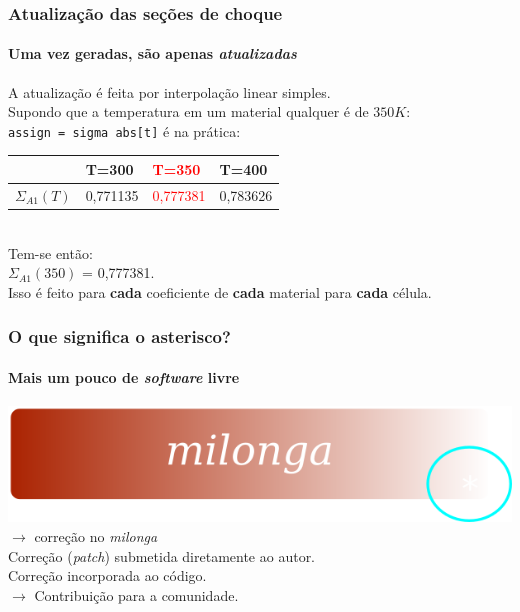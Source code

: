 \documentclass[svgnames,smaller,table]{beamer}
\begin{document}
\begin{frame}
  \frametitle{Atualização das seções de choque}
  \framesubtitle{Uma vez geradas, são apenas \textit{atualizadas}}
  A atualização é feita por interpolação linear simples.
  \\
  \vspace{0.2cm}
  Supondo que a temperatura em um material qualquer é de $350K$:
  \\
  \vspace{0.2cm}
  \texttt{assign = sigma abs[t]} é na prática:
  \centering
  \\
  \vspace{0.2cm}
  \begin{tabular}{llll}
                 & T=300  & \textcolor{red}{T=350} & T=400 \\ \hline
    $\Sigma_{A1}(T)$ & 0,771135       & \textcolor{red}{0,777381}         & 0,783626      
  \end{tabular}
  \\
  \vspace{0.2cm}
  Tem-se então:
  \\
  \vspace{0.2cm}
  $\Sigma_{A1}(350)$ = 0,777381.
  \\
  \vspace{0.2cm}
  Isso é feito para \textbf{cada} coeficiente de \textbf{cada} material para \textbf{cada} célula.
\end{frame}



{

\begin{frame}
  \frametitle{O que significa o asterisco?}
  \framesubtitle{Mais um pouco de \textit{software} livre}
  \centering
  \includegraphics[scale=1.0]{../figuras/mil-asterisco-neg.png}
  $\rightarrow$ correção no \textit{milonga}
  \\
  \vspace{0.5cm}
  Correção (\textit{patch}) submetida diretamente ao autor.
  \\
  Correção incorporada ao código.
  \\
  \vspace{0.5cm}
  \Large{$\rightarrow$ Contribuição para a comunidade.}
\end{frame}
}
\end{document}
